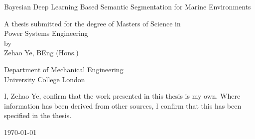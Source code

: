 \thispagestyle{coverpage}


\begin{center}

    \Huge Bayesian Deep Learning Based Semantic Segmentation for Marine Environments

    
    \vspace{22mm}
    
    \Large A thesis submitted for the degree of Masters of Science in \\
    \Large Power Systems Engineering  \\
    \Large by  \\
    \Large Zehao Ye, BEng (Hons.)
    
    \vspace{20mm}

    \Large Department of Mechanical Engineering  \\
    \Large University College London

    \vspace{20mm}

    \begin{minipage}[t]{0.8\textwidth}
        \centering
        \Large I, Zehao Ye, confirm that the work presented in this thesis is my own. Where information has been 
        derived from other sources, I confirm that this has been specified in the thesis.
    \end{minipage}

    \vspace{20mm}

    \Large \today
    
    {\raggedleft\vfill\itshape{}\par}


\end{center}
